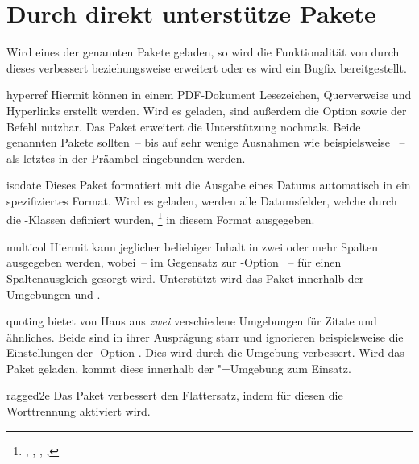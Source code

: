\section{Durch \TUDScript direkt unterstütze Pakete}
%
Wird eines der genannten Pakete geladen, so wird die Funktionalität von 
\TUDScript durch dieses verbessert beziehungsweise erweitert oder es wird ein 
Bugfix bereitgestellt.
%
\begin{packages}
\item[hyperref]
  Hiermit können in einem PDF-Dokument Lesezeichen, Querverweise und 
  Hyperlinks erstellt werden. Wird es geladen, sind außerdem die Option 
   sowie der Befehl  nutzbar. Das 
  Paket  erweitert die Unterstützung nochmals. Beide 
  genannten Pakete sollten~-- bis auf sehr wenige Ausnahmen wie beispielsweise 
  ~-- als letztes in der Präambel eingebunden werden.
\item[isodate]
  Dieses Paket formatiert mit  die Ausgabe 
  eines Datums automatisch in ein spezifiziertes Format. Wird es geladen, 
  werden alle Datumsfelder, welche durch die \TUDScript-Klassen definiert 
  wurden,%
  \footnote{%
    , , , , 
  }
  in diesem Format ausgegeben.
\item[multicol]
  Hiermit kann jeglicher beliebiger Inhalt in zwei oder mehr Spalten ausgegeben 
  werden, wobei~-- im Gegensatz zur \KOMAScript-Option ~-- 
  für einen Spaltenausgleich gesorgt wird. Unterstützt wird das Paket innerhalb 
  der Umgebungen  und .
\item[quoting]
   bietet von Haus aus \emph{zwei} verschiedene Umgebungen für 
  Zitate und ähnliches. Beide sind in ihrer Ausprägung starr und ignorieren 
  beispielsweise die Einstellungen der \KOMAScript-Option . 
  Dies wird durch die Umgebung  verbessert. Wird das Paket 
  geladen, kommt diese innerhalb der "=Umgebung zum 
  Einsatz.
\item[ragged2e]
  Das Paket verbessert den Flattersatz, indem für diesen die Worttrennung 
  aktiviert wird.
\end{packages}



